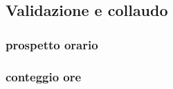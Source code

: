 \subsection{Validazione e collaudo}
	\subsubsection{prospetto orario}
	\subsubsection{conteggio ore}

